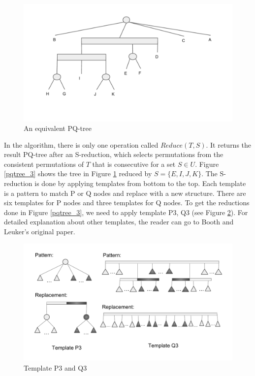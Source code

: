\begin{figure}[H]
\centering
\includegraphics[width=12cm]{figures/pqtree_2.pdf}
\caption{An equivalent PQ-tree}
\label{pqtree_2}
\end{figure}

In the algorithm, there is only one operation called $Reduce(T,S)$. It returns the result PQ-tree after an S-reduction, which selects permutations from the consistent permutations of $T$ that is consecutive for a set $S \in U$. Figure \ref{pqtree_3} shows the tree in Figure \ref{pqtree_2} reduced by $S = \{ E,I,J,K\}$. The S-reduction is done by applying templates from bottom to the top. Each template is a pattern to match P or Q nodes and replace with a new structure. There are six templates for P nodes and three templates for Q nodes. To get the reductions done in Figure \ref{pqtree_3}, we need to apply template P3, Q3 (see Figure \ref{pqtree_p3q3}). For detailed explanation about other templates, the reader can go to Booth and Leuker's original paper\cite{booth1976testing}.

\begin{figure}[H]
\centering
\includegraphics[width=16cm]{figures/pqtree_p3q3.pdf}
\caption{Template P3 and Q3}
\label{pqtree_p3q3}
\end{figure}


